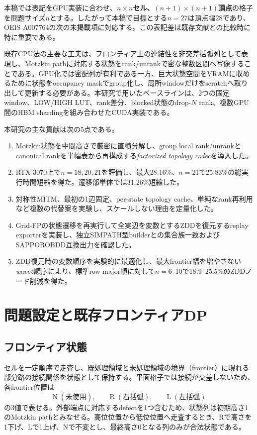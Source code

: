 \documentclass[a4paper,10pt,twocolumn]{ltjsarticle}
\newcommand{\R}{\mathrm{R}}
\newcommand{\Lsym}{\mathrm{L}}
\newcommand{\Nsym}{\mathrm{N}}
\begin{document}
本稿では表記をGPU実装に合わせ、\textbf{$n\times n$セル、$(n+1)\times(n+1)$頂点}の格子を問題サイズ$n$とする。したがって本稿で目標とする$n=27$は頂点幅28であり、OEIS A007764の次の未掲載項に対応する。この表記差は既存文献との比較時に特に重要である。

既存CPU法の主要な工夫は、フロンティア上の連結性を非交差括弧列として表現し、Motzkin pathに対応する状態をrank/unrankで密な整数区間へ写像することである。GPU化では密配列が有利である一方、巨大状態空間をVRAMに収めるために状態をoccupancy maskでgroup化し、局所windowだけをscratchへ取り出して更新する必要がある。本研究で用いたベースラインは、2つの固定window、LOW/HIGH LUT、rank差分、blocked状態のdrop-$N$ rank、複数GPU間のHBM shardingを組み合わせたCUDA実装である。

本研究の主な貢献は次の5点である。
\begin{enumerate}
  \item Motzkin状態を中間高さで厳密に直積分解し、group local rank/unrankとcanonical rankを半幅表から再構成する\emph{factorized topology codec}を導入した。
  \item RTX 3070上で$n=18,20,21$を評価し、最大28.16\%、$n=21$で25.83\%の総実行時間短縮を得た。遷移部単体では31.26\%短縮した。
  \item 対称性MITM、最初の1辺固定、per-state topology cache、単純なrank再利用など複数の代替案を実験し、スケールしない理由を定量化した。
  \item Grid-FPの状態遷移を再実行して全実辺を変数とするZDDを復元するreplay exporterを実装し、独立SIMPATH型builderとの集合族一致およびSAPPOROBDD互換出力を確認した。
  \item ZDD復元時の変数順序を実験的に最適化し、最大frontier幅を増やさない\emph{wave2}順序により、標準row-major順に対して$n=6$--10で18.9--25.5\%のZDDノード削減を得た。
\end{enumerate}

\section{問題設定と既存フロンティアDP}
\subsection{フロンティア状態}
セルを一定順序で走査し、既処理領域と未処理領域の境界（frontier）に現れる部分路の接続関係を状態として保持する。平面格子では接続が交差しないため、各frontier位置は
\[
\Nsym\;(未使用),\qquad \R\;(右括弧),\qquad \Lsym\;(左括弧)
\]
の3値で表せる。外部端点に対応するdefectを1つ含むため、状態列は初期高さ1のMotzkin pathとみなせる。高位位置から低位位置へ走査するとき、$\R$で高さを1下げ、$\Lsym$で1上げ、$\Nsym$で不変とし、最終高さ0となる列のみが合法状態である。
\end{document}
